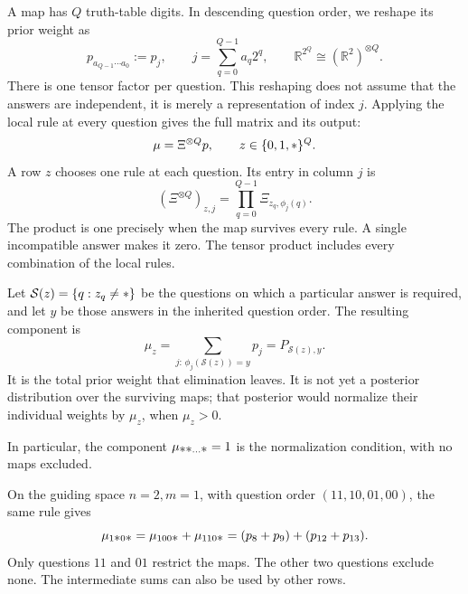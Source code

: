 \documentclass[11pt]{article}
\newcommand{\wild}{\mathord{\text{\normalsize$\ast$}}}
\begin{document}
A map has $Q$ truth-table digits. In descending question order, we reshape its
prior weight as
\begin{equation}
  p_{a_{Q-1}\cdots a_0}:=p_j,
  \qquad j=\sum_{q=0}^{Q-1}a_q2^q,
  \qquad \mathbb R^{2^Q}\cong(\mathbb R^2)^{\otimes Q}.
\end{equation}
There is one tensor factor per question. This reshaping does not assume
that the answers are independent, it is merely a representation of index $j$. Applying the local rule at every
question gives the full matrix and its output:
\begin{equation}\label{eq:Xi-transform}
  \mu=\Xi^{\otimes Q}p,
  \qquad z\in\{0,1,\wild\}^Q.
\end{equation}
A row $z$ chooses one rule at each question. Its entry in column $j$ is
\begin{equation}\label{eq:Xi-survival}
  (\Xi^{\otimes Q})_{z,j}
  =\prod_{q=0}^{Q-1}\Xi_{z_q,\phi_j(q)}.
\end{equation}
The product is one precisely when the map survives every rule. A single
incompatible answer makes it zero. The tensor product includes every
combination of the local rules.

Let $\mathcal S(z)=\{q:z_q\ne\wild\}$ be the questions on which a
particular answer is required, and let $y$ be those answers in the inherited
question order. The resulting component is
\begin{equation}\label{eq:Xi-components}
  \mu_z=\sum_{j:\,\phi_j(\mathcal S(z))=y}p_j
      =P_{\mathcal S(z),y}.
\end{equation}
It is the total prior weight that elimination leaves. It is not yet a
posterior distribution over the surviving maps; that posterior would
normalize their individual weights by $\mu_z$, when $\mu_z>0$.


In particular, the component $\mu_{\wild\wild\ldots\wild} = 1$ is the normalization
condition, with no maps excluded.

\begin{example}
On the guiding space $n=2, m=1$, with question order $(11,10,01,00)$, the same
rule gives
\begin{equation}
  \mu_{1\wild0\wild}
  =\mu_{100\wild}+\mu_{110\wild}
  =(p_8+p_9)+(p_{12}+p_{13}).
\end{equation}
Only questions $11$ and $01$ restrict the maps. The other two questions
exclude none. The intermediate sums can also be used by other rows.
\end{example}
\end{document}
